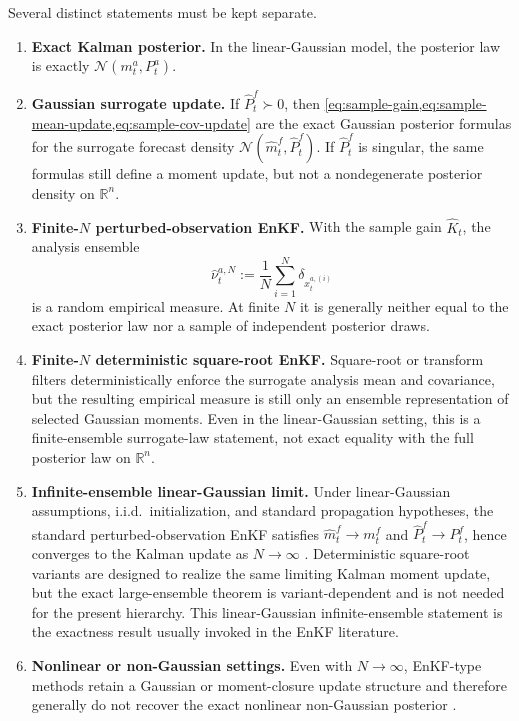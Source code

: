\documentclass[11pt]{article}
\newcommand{\R}{\mathbb{R}}
\numberwithin{equation}{section}
\theoremstyle{plain}
\theoremstyle{definition}
\theoremstyle{remark}
\begin{document}
Several distinct statements must be kept separate.
\begin{enumerate}[label=\arabic*.]
\item \textbf{Exact Kalman posterior.} In the linear-Gaussian model, the posterior law is exactly $\mathcal N(m_t^a,P_t^a)$.
\item \textbf{Gaussian surrogate update.} If $\hat P_t^f\succ0$, then \cref{eq:sample-gain,eq:sample-mean-update,eq:sample-cov-update} are the exact Gaussian posterior formulas for the surrogate forecast density $\mathcal N(\hat m_t^f,\hat P_t^f)$. If $\hat P_t^f$ is singular, the same formulas still define a moment update, but not a nondegenerate posterior density on $\R^n$.
\item \textbf{Finite-$N$ perturbed-observation EnKF.} With the sample gain $\hat K_t$, the analysis ensemble
\[
\hat \nu_t^{a,N}:=\frac1N\sum_{i=1}^{N}\delta_{x_t^{a,(i)}}
\]
is a random empirical measure. At finite $N$ it is generally neither equal to the exact posterior law nor a sample of independent posterior draws.
\item \textbf{Finite-$N$ deterministic square-root EnKF.} Square-root or transform filters deterministically enforce the surrogate analysis mean and covariance, but the resulting empirical measure is still only an ensemble representation of selected Gaussian moments. Even in the linear-Gaussian setting, this is a finite-ensemble surrogate-law statement, not exact equality with the full posterior law on $\R^n$.
\item \textbf{Infinite-ensemble linear-Gaussian limit.} Under linear-Gaussian assumptions, i.i.d.\ initialization, and standard propagation hypotheses, the standard perturbed-observation EnKF satisfies $\hat m_t^f\to m_t^f$ and $\hat P_t^f\to P_t^f$, hence converges to the Kalman update as $N\to\infty$ \citep{mandel2011}. Deterministic square-root variants are designed to realize the same limiting Kalman moment update, but the exact large-ensemble theorem is variant-dependent and is not needed for the present hierarchy. This linear-Gaussian infinite-ensemble statement is the exactness result usually invoked in the EnKF literature.
\item \textbf{Nonlinear or non-Gaussian settings.} Even with $N\to\infty$, EnKF-type methods retain a Gaussian or moment-closure update structure and therefore generally do not recover the exact nonlinear non-Gaussian posterior \citep{evensen2003,kelly2014,vanleeuwen2019,reich2019}.
\end{enumerate}
\end{document}
